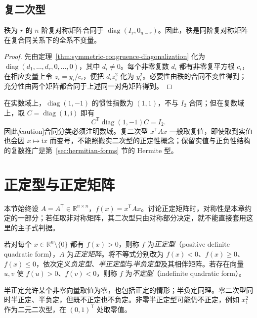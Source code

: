 \subsection{复二次型}

\begin{theorem}
\label{thm:complex-symmetric-congruence-classification}
秩为 $r$ 的 $n$ 阶复对称矩阵合同于 $\operatorname{diag}(I_r,0_{n-r})$。因此，秩是同阶复对称矩阵在复合同关系下的全系不变量。
\end{theorem}
\begin{proof}
先由定理~\ref{thm:symmetric-congruence-diagonalization} 化为 $\operatorname{diag}(d_1,\ldots,d_r,0,\ldots,0)$，其中 $d_i\ne0$。每个非零复数 $d_i$ 都有非零复平方根 $c_i$，在相应变量上令 $z_i=y_i/c_i$，便把 $d_iz_i^2$ 化为 $y_i^2$。必要性由秩的合同不变性得到；充分性由两个矩阵都合同于上述同一对角矩阵得到。
\end{proof}

在实数域上，$\operatorname{diag}(1,-1)$ 的惯性指数为 $(1,1)$，不与 $I_2$ 合同；但在复数域上，取 $C=\operatorname{diag}(1,\mathrm i)$ 即有
\[
    C^{\mathsf T}\operatorname{diag}(1,-1)C=I_2.
\]
因此\emph[caution]{合同分类必须注明数域}。复二次型 $x^{\mathsf T}Ax$ 一般取复值，即使取到实值也会因 $x\mapsto\mathrm i x$ 而变号，不能照搬实二次型的正定性概念；保留实值与正负性结构的复数推广是第~\ref{sec:hermitian-forms} 节的 Hermite 型。

\section{正定型与正定矩阵}
\label{sec:positive-definite-quadratic}

本节始终设 $A=A^{\mathsf T}\in\mathbb R^{n\times n}$，$f(x)=x^{\mathsf T}Ax$。讨论正定矩阵时，对称性是本章约定的一部分；若任取非对称矩阵，其二次型只由对称部分决定，就不能直接套用这里的主子式判据。

\begin{definition}
\label{def:quadratic-definiteness}
若对每个 $x\in\mathbb R^n\setminus\{0\}$ 都有 $f(x)>0$，则称 $f$ 为\emph{正定型}（positive definite quadratic form），$A$ 为\emph{正定矩阵}。将不等式分别改为 $f(x)<0$、$f(x)\geq0$、$f(x)\leq0$，依次定义\emph{负定型}、\emph{半正定型}与\emph{半负定型}及其相伴矩阵。若存在向量 $u,v$ 使 $f(u)>0$、$f(v)<0$，则称 $f$ 为\emph{不定型}（indefinite quadratic form）。
\end{definition}

半正定允许某个非零向量取值为零，也包括正定的情形；半负定同理。零二次型同时半正定、半负定，但既不正定也不负定。非零半正定型可能仍不正定，例如 $x_1^2$ 作为二元二次型，在 $(0,1)^{\mathsf T}$ 处取零值。

